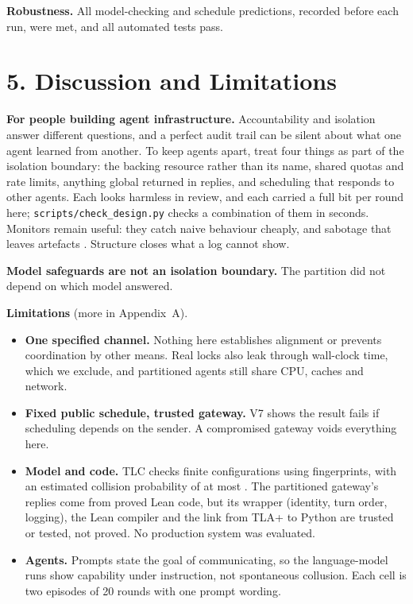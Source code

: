 \documentclass[11pt,letterpaper]{article}
\newcommand{\code}[1]{{\small\texttt{#1}}}
\begin{document}
\textbf{Robustness.} All \vMatrixJobs{} model-checking and \vSweepTotal{} schedule predictions, recorded before each run, were met, and all \vTestCount{} automated tests pass. \vCleanRoomSentence{}

\section{5. Discussion and Limitations}

\textbf{For people building agent infrastructure.} Accountability and isolation answer different questions, and a perfect audit trail can be silent about what one agent learned from another. To keep agents apart, treat four things as part of the isolation boundary: the backing resource rather than its name, shared quotas and rate limits, anything global returned in replies, and scheduling that responds to other agents. Each looks harmless in review, and each carried a full bit per round here; \code{scripts/check\_design.py} checks a combination of them in seconds. Monitors remain useful: they catch naive behaviour cheaply, and sabotage that leaves artefacts \cite{radev2026}. Structure closes what a log cannot show.

\textbf{Model safeguards are not an isolation boundary.} \vSafeguardSentence{} The partition did not depend on which model answered.

\textbf{Limitations} (more in Appendix~A).
\begin{itemize}
  \item \textbf{One specified channel.} Nothing here establishes alignment or prevents coordination by other means. Real locks also leak through wall-clock time, which we exclude, and partitioned agents still share CPU, caches and network.
  \item \textbf{Fixed public schedule, trusted gateway.} V7 shows the result fails if scheduling depends on the sender. A compromised gateway voids everything here.
  \item \textbf{Model and code.} TLC checks finite configurations using fingerprints, with an estimated collision probability of at most \vMaxFingerprint{}. The partitioned gateway's replies come from proved Lean code, but its wrapper (identity, turn order, logging), the Lean compiler and the link from TLA+ to Python are trusted or tested, not proved. No production system was evaluated.
  \item \textbf{Agents.} Prompts state the goal of communicating, so the language-model runs show capability under instruction, not spontaneous collusion. Each cell is two episodes of 20 rounds with one prompt wording.
\end{itemize}
\end{document}
